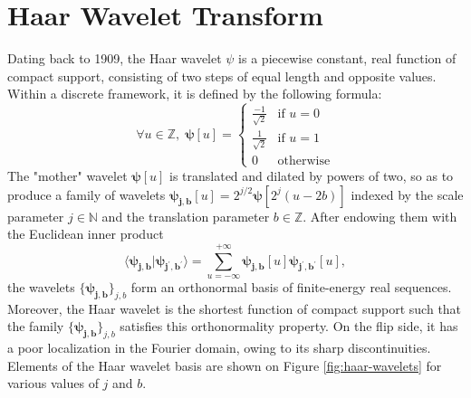 \documentclass{article}
\begin{document}
\section{Haar Wavelet Transform}\label{sec:haar}
Dating back to 1909, the Haar wavelet $\psi$ is a piecewise constant, real function of compact
support, consisting of two steps of equal length and opposite values. Within a discrete framework,
it is defined by the following formula:
\begin{equation}
\forall u \in \mathbb{Z}, \;
\boldsymbol{\psi}[u] = \left\{ \begin{array}{cl}
\frac{-1}{\sqrt{2}} & \mbox{if }u = 0\\
\frac{1}{\sqrt{2}} & \mbox{if }u = 1\\
0 & \mbox{otherwise}
\end{array}\right.
\end{equation}
The "mother" wavelet $\boldsymbol{\psi}[u]$ is translated and dilated by powers of two, so as to
produce a family of wavelets $\boldsymbol{\psi_{j,b}}[u] = 2^{j/2} \boldsymbol{\psi}[2^j (u - 2b)]$
indexed by the scale parameter $j \in \mathbb{N}$ and the translation parameter $b \in \mathbb{Z}$.
After endowing them with the Euclidean inner product
\begin{equation}
\langle \boldsymbol{\psi_{j,b}} \vert \boldsymbol{\psi_{j^\prime,b^\prime}} \rangle
 =
 \sum_{u = -\infty}^{+\infty}
 \boldsymbol{\psi_{j, b}}[u]
  \boldsymbol{\psi_{j^\prime,b^\prime}}[u],
\end{equation}
the wavelets $\{\boldsymbol{\psi_{j,b}}\}_{j,b}$ form an orthonormal basis of finite-energy
real sequences.
Moreover, the Haar wavelet is the shortest function of compact support such that the family
$\{\boldsymbol{\psi_{j,b}}\}_{j,b}$ satisfies this orthonormality property.
On the flip side, it has a poor localization in the Fourier domain, owing to its sharp discontinuities.
Elements of the Haar wavelet basis are shown on Figure \ref{fig:haar-wavelets} for various values of $j$ and $b$.
\end{document}

